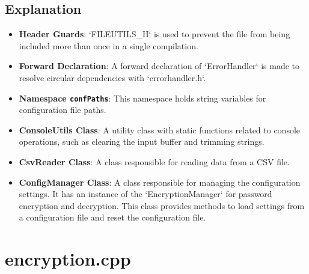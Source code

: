 \documentclass{article}
\begin{document}
	\subsection*{Explanation}
	\begin{itemize}
		\item \textbf{Header Guards}: `FILEUTILS\_H` is used to prevent the file from being included more than once in a single compilation.
		\item \textbf{Forward Declaration}: A forward declaration of `ErrorHandler` is made to resolve circular dependencies with `errorhandler.h`.
		\item \textbf{Namespace \texttt{confPaths}}: This namespace holds string variables for configuration file paths.
		\item \textbf{ConsoleUtils Class}: A utility class with static functions related to console operations, such as clearing the input buffer and trimming strings.
		\item \textbf{CsvReader Class}: A class responsible for reading data from a CSV file.
		\item \textbf{ConfigManager Class}: A class responsible for managing the configuration settings. It has an instance of the `EncryptionManager` for password encryption and decryption. This class provides methods to load settings from a configuration file and reset the configuration file.
	\end{itemize}
	
	\section{encryption.cpp}
	
\end{document}
